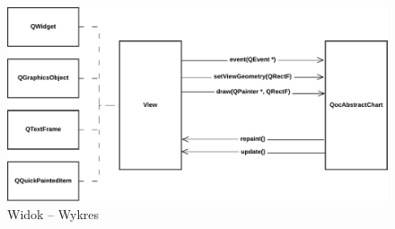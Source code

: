 \begin{figure}[H]
\centering
\includegraphics[scale=0.75]{img/widok-wykres.pdf}
\caption{Widok -- Wykres}\label{rys:widok:wykres}
\end{figure}




